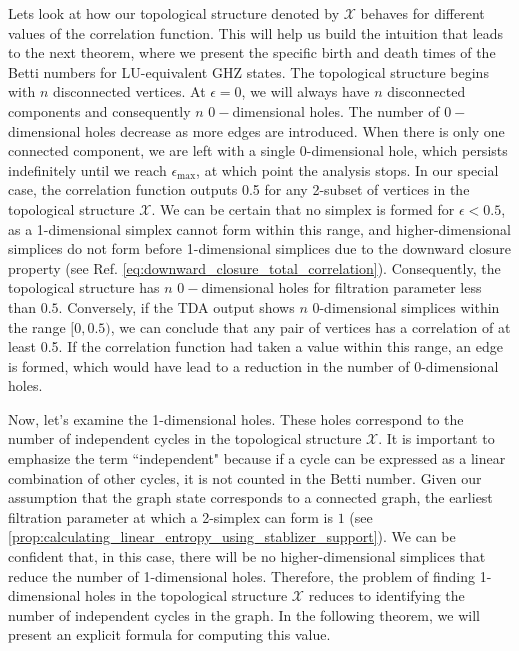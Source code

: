 \documentclass{article}
\begin{document}
 Lets look at how our topological structure denoted by $\mathcal{X} $ behaves for different values of the correlation function. This will help us build the intuition that leads to the next theorem, where we present the specific birth and death times of the Betti numbers for LU-equivalent GHZ states. The topological structure begins with $n$ disconnected vertices. At $\epsilon = 0$, we will always have $n$ disconnected components and consequently $n$ $0-$dimensional holes. The number of $0-$dimensional holes decrease as more edges are introduced. When there is only one connected component, we are left with a single 0-dimensional hole, which persists indefinitely until we reach $ \epsilon_{\text{max}} $, at which point the analysis stops. In our special case, the correlation function outputs 0.5 for any 2-subset of vertices in the topological structure $ \mathcal{X} $. We can be certain that no simplex is formed for $ \epsilon < 0.5 $, as a 1-dimensional simplex cannot form within this range, and higher-dimensional simplices do not form before 1-dimensional simplices due to the downward closure property (see Ref. \ref{eq:downward_closure_total_correlation}). Consequently, the topological structure has $n$ $0-$dimensional holes for filtration parameter less than $0.5$. Conversely, if the TDA output shows $ n $ 0-dimensional simplices within the range $[0, 0.5)$, we can conclude that any pair of vertices has a correlation of at least 0.5. If the correlation function had taken a value within this range, an edge is formed, which would have lead to a reduction in the number of 0-dimensional holes.


Now, let's examine the 1-dimensional holes. These holes correspond to the number of independent cycles in the topological structure $ \mathcal{X} $. It is important to emphasize the term ``independent" because if a cycle can be expressed as a linear combination of other cycles, it is not counted in the Betti number. Given our assumption that the graph state corresponds to a connected graph, the earliest filtration parameter at which a 2-simplex can form is $ 1 $ (see \ref{prop:calculating_linear_entropy_using_stablizer_support}). We can be confident that, in this case, there will be no higher-dimensional simplices that reduce the number of 1-dimensional holes. Therefore, the problem of finding 1-dimensional holes in the topological structure $ \mathcal{X} $ reduces to identifying the number of independent cycles in the graph. In the following theorem, we will present an explicit formula for computing this value.
\end{document}
